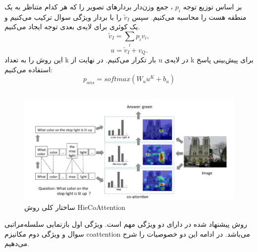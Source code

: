{{{	    بر اساس توزیع توجه
	     $p_i$
	     ، جمع وزن‌دار بردارهای تصویر را که هر کدام متناظر به یک منطقه هست را محاسبه می‌کنیم. سپس
	     $\tilde{v}_I$
	      را با بردار ویژگی سوال ترکیب می‌کنیم و یک کوئری برای لایه‌ی بعدی توجه ایجاد می‌کنیم.	    
	     \begin{equation}
	      	\tilde{v}_I =\sum_i p_iv_i,
	     \end{equation}
	     \begin{equation}
	        u =\tilde{v}_I + v_Q.
	     \end{equation}
	      این روش را به تعداد k بار تکرار می‌کنیم. در نهایت از u در لایه‌ی k برای پیش‌بینی پاسخ استفاده می‌کنیم:
	     \begin{equation}
	     	p_{ans} =softmax(W_uu^K + b_u)
	     \end{equation}
	     
		}
	}

	\subsection{ \cite{lu2016hierarchical}}
	{
		\begin{figure}
			\centering
			\includegraphics[scale=0.6]{images/hiecoattention.JPG}
			\caption{ساختار کلی روش HieCoAttention}
			\label{fig:7}
		\end{figure}
		روش پیشنهاد شده در 
		\cite{}
		دارای دو ویژگی مهم است. ویژگی اول بازنمایی سلسله‌مراتبی سوال و ویژگی دوم مکانیزم coattention می‌باشد. در ادامه این دو خصوصیات را شرح می‌دهیم.
		
}}
